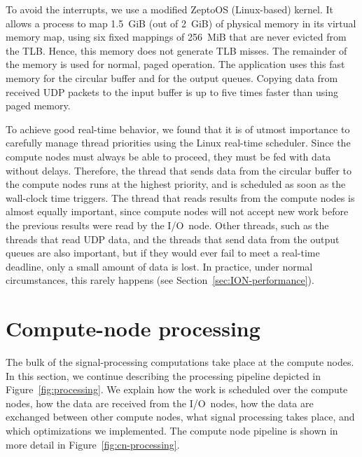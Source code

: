 \documentclass{sig-alternate}
\begin{document}
To avoid the interrupts, we use a modified ZeptoOS (Linux-based)
kernel\cite{Yoshii:09}.
It allows a process to map 1.5~GiB (out of 2~GiB) of physical memory in its
virtual memory map, using six fixed mappings of 256~MiB that are never evicted
from the TLB.
Hence, this memory does not generate TLB misses.
The remainder of the memory is used for normal, paged operation.
The application uses this fast memory for the circular buffer and for the
output queues.
Copying data from received UDP packets to the input buffer is up to five times
faster than using paged memory.

To achieve good real-time behavior, we found that it is of utmost importance
to carefully manage thread priorities using the Linux real-time scheduler.
Since the compute nodes must always be able to proceed, they must be fed with
data without delays.
Therefore, the thread that sends data from the circular buffer to the
compute nodes runs at the highest priority, and is scheduled as soon as the
wall-clock time triggers.
The thread that reads results from the compute nodes is almost equally
important, since compute nodes will not accept new work before the previous
results were read by the I/O~node.
Other threads, such as the threads that read UDP data, and the threads that
send data from the output queues are also important, but if they would ever
fail to meet a real-time deadline, only a small amount of data is lost.
In practice, under normal circumstances, this rarely happens
(see Section~\ref{sec:ION-performance}).




\section{Compute-node processing}
\label{sec:CNProc}

The bulk of the signal-processing computations take place at the compute nodes.
In this section, we continue describing the processing pipeline depicted in
Figure~\ref{fig:processing}. 
We explain how the work is scheduled over the compute nodes, how the data are
received from the I/O~nodes, how the data are exchanged between other compute
nodes, what signal processing takes place, and which optimizations we
implemented.
The compute node pipeline is shown in more detail in
Figure~\ref{fig:cn-processing}.
\end{document}
